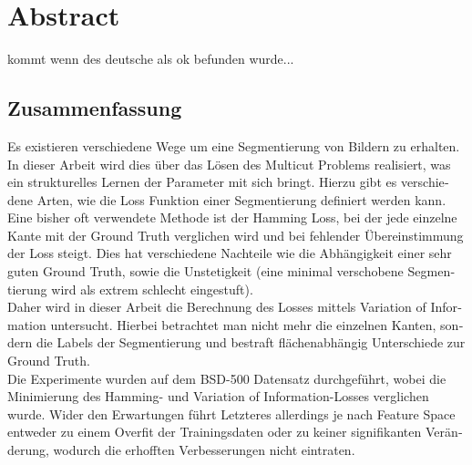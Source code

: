 \begingroup
\let\clearpage\relax
\let\cleardoublepage\relax
\let\cleardoublepage\relax

\chapter*{Abstract}
kommt wenn des deutsche als ok befunden wurde...


\vfill

\begin{otherlanguage}{ngerman}
\chapter*{Zusammenfassung}
Es existieren verschiedene Wege um eine Segmentierung von Bildern zu erhalten. In dieser Arbeit wird dies über das Lösen des Multicut Problems realisiert, was ein strukturelles Lernen der Parameter mit sich bringt. Hierzu gibt es verschiedene Arten, wie die Loss Funktion einer Segmentierung definiert werden kann. Eine bisher oft verwendete Methode ist der Hamming Loss, bei der jede einzelne Kante mit der Ground Truth verglichen wird und bei fehlender Übereinstimmung der Loss steigt. Dies hat verschiedene Nachteile wie die Abhängigkeit einer sehr guten Ground Truth, sowie die Unstetigkeit (eine minimal verschobene Segmentierung wird als extrem schlecht eingestuft). \\
Daher wird in dieser Arbeit die Berechnung des Losses mittels Variation of Information untersucht. Hierbei betrachtet man nicht mehr die einzelnen Kanten, sondern die Labels der Segmentierung und bestraft flächenabhängig Unterschiede zur Ground Truth. \\
Die Experimente wurden auf dem BSD-500 Datensatz durchgeführt, wobei die Minimierung des Hamming- und Variation of Information-Losses verglichen wurde. Wider den Erwartungen führt Letzteres allerdings je nach Feature Space entweder zu einem Overfit der Trainingsdaten oder zu keiner signifikanten Veränderung, wodurch die erhofften Verbesserungen nicht eintraten.

\end{otherlanguage}

\endgroup			

\vfill